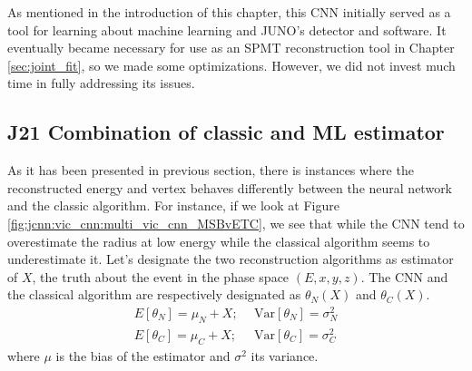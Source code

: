 \documentclass[../main.tex]{subfiles}
\begin{document}
{{As mentioned in the introduction of this chapter, this CNN initially served as a tool for learning about machine learning and JUNO's detector and software. It eventually became necessary for use as an SPMT reconstruction tool in Chapter \ref{sec:joint_fit}, so we made some optimizations. However, we did not invest much time in fully addressing its issues.

\subsection{J21 Combination of classic and ML estimator}
\label{sec:jcnn:combination}


As it has been presented in previous section, there is instances where the reconstructed energy and vertex behaves differently between the neural network and  the classic algorithm. For instance, if we look at Figure \ref{fig:jcnn:vic_cnn:multi_vic_cnn_MSBvETC}, we see that while the CNN tend to overestimate the radius at low energy while the classical algorithm seems to underestimate it. Let's designate the two reconstruction algorithms as estimator of $X$, the truth about the event in the phase space $(E, x, y, z)$. The CNN and the classical algorithm are respectively designated as $\theta_{N}(X)$ and $\theta_{C}(X)$.
\begin{align}
  E[\theta_{N}] = \mu_N + X; ~&~ \mathrm{Var}[\theta_{N}] = \sigma^2_{N} \\
  E[\theta_{C}] = \mu_C + X; ~&~ \mathrm{Var}[\theta_{C}] = \sigma^2_{C}
\end{align}
where $\mu$ is the bias of the estimator and $\sigma^2$ its variance.

}}
\end{document}

